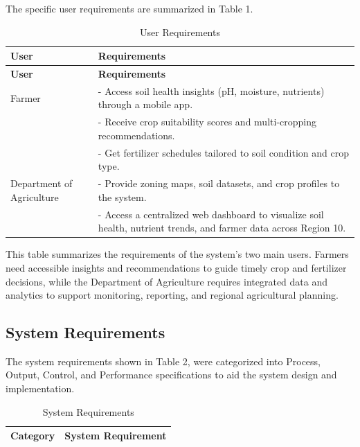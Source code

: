 {	The specific user requirements are summarized in Table 1.
	
	\begin{longtable}{p{3cm} p{10cm}}
		\caption{User Requirements} \label{tab:UserRequirements} \\
		\toprule
		\textbf{User} & \textbf{Requirements} \\
		\midrule
		\endfirsthead
		
		\toprule
		\textbf{User} & \textbf{Requirements} \\
		\midrule
		\endhead
		
		\bottomrule
		\endfoot
		
		Farmer & - Access soil health insights (pH, moisture, nutrients) through a mobile app. \\
		& - Receive crop suitability scores and multi-cropping recommendations. \\
		& - Get fertilizer schedules tailored to soil condition and crop type. \\
		\midrule
		
		Department of Agriculture & - Provide zoning maps, soil datasets, and crop profiles to the system. \\
		& - Access a centralized web dashboard to visualize soil health, nutrient trends, and farmer data across Region 10. \\
	\end{longtable}
	
	This table summarizes the requirements of the system’s two main users. Farmers need accessible insights and recommendations to guide timely crop and fertilizer decisions, while the Department of Agriculture requires integrated data and analytics to support monitoring, reporting, and regional agricultural planning. 
	
	\subsection{System Requirements}
	The system requirements shown in Table 2,  were categorized into Process, Output, Control, and Performance specifications to aid the system design and implementation.
	
	\begin{longtable}{p{4cm} p{9cm}}
		\caption{System Requirements} \label{tab:SystemRequirements} \\
		\toprule
		\textbf{Category} & \textbf{System Requirement} \\
		\midrule
		\endfirsthead
		

\end{longtable}}
